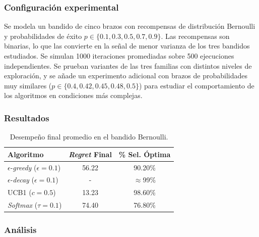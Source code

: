 \subsubsection*{Configuración experimental}

Se modela un bandido de cinco brazos con recompensas de distribución Bernoulli y probabilidades de éxito $p\in\{0.1, 0.3, 0.5, 0.7, 0.9\}$. Las recompensas son binarias, lo que las convierte en la señal de menor varianza de los tres bandidos estudiados. Se simulan 1000 iteraciones promediadas sobre 500 ejecuciones independientes. Se prueban variantes de las tres familias con distintos niveles de exploración, y se añade un experimento adicional con brazos de probabilidades muy similares ($p \in \{0.4, 0.42, 0.45, 0.48, 0.5\}$) para estudiar el comportamiento de los algoritmos en condiciones más complejas.

\subsubsection*{Resultados}

\begin{table}[H]
\centering
\begin{tabular}{|l|c|c|}
\hline
\textbf{Algoritmo} & \textbf{\textit{Regret} Final} & \textbf{\% Sel. Óptima} \\ \hline
$\epsilon$-\textit{greedy} ($\epsilon=0.1$) & 56.22 & 90.20\% \\ \hline
$\epsilon$-\textit{decay} ($\epsilon=0.1$) & - & $\approx$99\% \\ \hline
UCB1 ($c=0.5$) & 13.23 & 98.60\% \\ \hline
\textit{Softmax} ($\tau=0.1$) & 74.40 & 76.80\% \\ \hline
\end{tabular}
\caption{Desempeño final promedio en el bandido Bernoulli.}
\label{tab:resultados_bernoulli}
\end{table}

\subsubsection*{Análisis}


